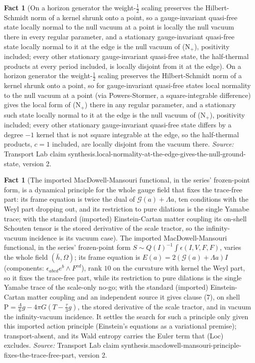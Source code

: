 \documentclass[11pt]{article}
\theoremstyle{definition}
\newtheorem{fact}[theorem]{Fact}
\theoremstyle{plain}
\providecommand{\Sch}{}\renewcommand{\Sch}{\mathrm{P}}
\providecommand{\hb}{}\renewcommand{\hb}{\bar{h}}
\begin{document}
\begin{fact}[On a horizon generator the weight-$\tfrac12$ scaling preserves the Hilbert-Schmidt norm of a kernel shrunk onto a point, so a gauge-invariant quasi-free state locally normal to the null vacuum at a point is locally the null vacuum there in every regular parameter, and a stationary gauge-invariant quasi-free state locally normal to it at the edge is the null vacuum of (N$_{+}$), positivity included; every other stationary gauge-invariant quasi-free state, the half-thermal products at every period included, is locally disjoint from it at the edge]\label{c:synthesis.local-normality-at-the-edge-gives-the-null-ground-state}
On a horizon generator the weight-$\tfrac12$ scaling preserves the Hilbert-Schmidt norm of a kernel shrunk onto a point, so for gauge-invariant quasi-free states local normality to the null vacuum at a point (via Powers-Stormer, a square-integrable difference) gives the local form of (N$_{+}$) there in any regular parameter, and a stationary such state locally normal to it at the edge is the null vacuum of (N$_{+}$), positivity included; every other stationary gauge-invariant quasi-free state differs by a degree $-1$ kernel that is not square integrable at the edge, so the half-thermal products, $c = 1$ included, are locally disjoint from the vacuum there.
\emph{Source:} Transport Lab claim synthesis.local-normality-at-the-edge-gives-the-null-ground-state, version 2.
\end{fact}

\begin{fact}[The imported MacDowell-Mansouri functional, in the series' frozen-point form, is a dynamical principle for the whole gauge field that fixes the trace-free part: its frame equation is twice the dual of $\mathcal{G}(a) + \Lambda a$, ten conditions with the Weyl part dropping out, and its restriction to pure dilations is the single Yamabe trace; with the standard (imported) Einstein-Cartan matter coupling its on-shell Schouten tensor is the stored derivative of the scale tractor, so the infinity-vacuum incidence is its vacuum case]\label{c:synthesis.macdowell-mansouri-principle-fixes-the-trace-free-part}
The imported MacDowell-Mansouri functional, in the series' frozen-point form $S \sim Q(I)^{-1}\int\epsilon(I, V, F, F)$, varies the whole field $(\hb, \Omega)$; its frame equation is $E(a) = 2(\mathcal{G}(a) + \Lambda a)I$ (components: $\epsilon_{abcd}e^{b}\wedge F^{cd}$), rank $10$ on the curvature with kernel the Weyl part, so it fixes the trace-free part, while its restriction to pure dilations is the single Yamabe trace of the scale-only no-go; with the standard (imported) Einstein-Cartan matter coupling and an independent source it gives clause (7), on shell $\Sch = \tfrac{\Lambda}{6}g - 4\pi G(T - \tfrac{\tau}{3}g)$, the stored derivative of the scale tractor, and in vacuum the infinity-vacuum incidence. It settles the search for such a principle only given this imported action principle (Einstein's equations as a variational premise); transport-absent, and its Wald entropy carries the Euler term that (Loc) excludes.
\emph{Source:} Transport Lab claim synthesis.macdowell-mansouri-principle-fixes-the-trace-free-part, version 2.
\end{fact}
\end{document}
